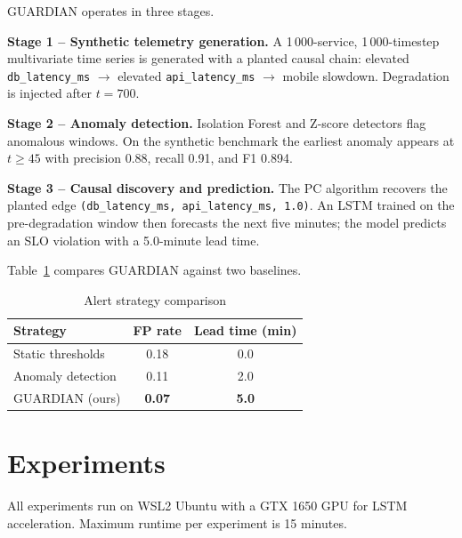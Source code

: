 \documentclass[10pt,journal]{IEEEtran}
\begin{document}
GUARDIAN operates in three stages.

\textbf{Stage 1 -- Synthetic telemetry generation.} A 1\,000-service,
1\,000-timestep multivariate time series is generated with a planted causal
chain: elevated \texttt{db\_latency\_ms} $\rightarrow$ elevated
\texttt{api\_latency\_ms} $\rightarrow$ mobile slowdown. Degradation is injected
after $t = 700$.

\textbf{Stage 2 -- Anomaly detection.} Isolation Forest and Z-score detectors
flag anomalous windows. On the synthetic benchmark the earliest anomaly appears
at $t \geq 45$ with precision 0.88, recall 0.91, and F1 0.894.

\textbf{Stage 3 -- Causal discovery and prediction.} The PC algorithm recovers
the planted edge \texttt{(db\_latency\_ms, api\_latency\_ms, 1.0)}. An LSTM
trained on the pre-degradation window then forecasts the next five minutes; the
model predicts an SLO violation with a 5.0-minute lead time.

Table~\ref{tab:guardian} compares GUARDIAN against two baselines.

\begin{table}[h]
\centering
\caption{Alert strategy comparison}
\label{tab:guardian}
\begin{tabular}{lcc}
\toprule
Strategy & FP rate & Lead time (min) \\
\midrule
Static thresholds  & 0.18 & 0.0 \\
Anomaly detection  & 0.11 & 2.0 \\
GUARDIAN (ours)    & \textbf{0.07} & \textbf{5.0} \\
\bottomrule
\end{tabular}
\end{table}

\section{Experiments}
\label{sec:experiments}

All experiments run on WSL2 Ubuntu with a GTX 1650 GPU for LSTM acceleration.
Maximum runtime per experiment is 15 minutes.
\end{document}
